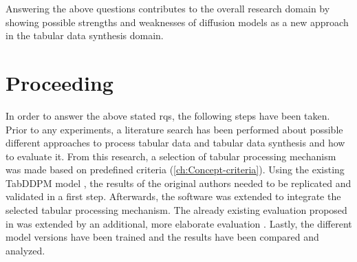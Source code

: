 Answering the above questions contributes to the overall research domain by showing possible strengths and weaknesses of diffusion models
as a new approach in the tabular data synthesis domain. 

\section{Proceeding}
\label{ch:intro-proceeding}
In order to answer the above stated \glspl{rq}, the following steps have been taken.
Prior to any experiments, a literature search has been performed about possible different approaches to process tabular data and tabular data synthesis and how to evaluate it.
From this research, a selection of tabular processing mechanism was made based on predefined criteria (\autoref{ch:Concept-criteria}).
Using the existing TabDDPM model \cite{kotelnikov2022TabDDPMModellingTabular}, the results of the original authors needed to be replicated and validated in a first step.
Afterwards, the software was extended to integrate the selected tabular processing mechanism.
The already existing evaluation proposed in \cite{kotelnikov2022TabDDPMModellingTabular} was extended by an additional, more elaborate evaluation \cite{akim2023TabDDPMModellingTabular}.
Lastly, the different model versions have been trained and the results have been compared and analyzed.

